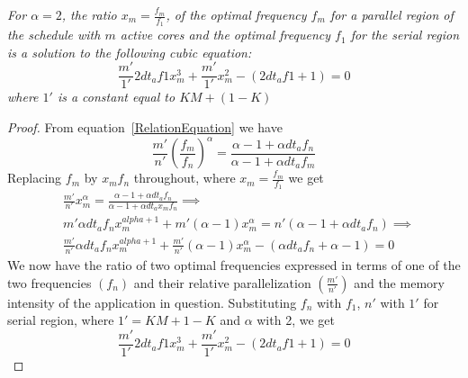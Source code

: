 \documentclass[11pt, letterpaper]{article}
\newenvironment{oldlem}[1]{\par\noindent{\bf Lemma #1:}
  \em \noindent}{\par}
\newcommand{\olem}[1]{\begin{oldlem}{\ref{#1}}}
\newcommand{\eolem}{\end{oldlem} \medskip}
\begin{document}
\olem{CubicEquation}
 For $\alpha=2$, the ratio $x_m= \frac{f_m}{f_1}$, of the optimal frequency $f_m$ for a parallel region of the schedule with $m$ active cores and the optimal frequency $f_1$ for the serial region is a solution to the following cubic equation:
 \begin{displaymath}
   \frac{m'}{1'}2dt_af1x_m^3 + \frac{m'}{1'}x_m^2 -(2dt_af1 + 1) = 0
 \end{displaymath}
 where $1'$ is a constant equal to $KM + (1-K)$
\eolem
\begin{proof}
 From equation~\ref{RelationEquation} we have
 \begin{displaymath}
  \frac{m'}{n'}(\frac{f_m}{f_n})^\alpha = \frac{\alpha -1 + \alpha dt_af_n}{\alpha -1 + \alpha dt_af_m}
 \end{displaymath}
 Replacing $f_m$ by $x_mf_n$ throughout, where $x_m = \frac{f_m}{f_1}$ we get
 \begin{displaymath}
 \begin{aligned}
  &\frac{m'}{n'}x_m^\alpha = \frac{\alpha -1 + \alpha dt_af_n}{\alpha -1 + \alpha dt_ax_mf_n} \implies\\
 & m'\alpha dt_af_nx_m^{alpha+1} + m'(\alpha-1)x_m^\alpha = n'(\alpha - 1 + \alpha dt_af_n) \implies \\
 &\frac{m'}{n'}\alpha dt_af_nx_m^{alpha+1} + \frac{m'}{n'}(\alpha-1)x_m^\alpha -(\alpha dt_af_n + \alpha -1) = 0
  \end{aligned}
 \end{displaymath}
 We now have the ratio of two optimal frequencies expressed in terms of one of the two frequencies $(f_n)$ and their relative parallelization $(\frac{m'}{n'})$ and the memory intensity of the application in question. 
 Substituting $f_n$ with $f_1$, $n'$ with $1'$ for serial region,  where $1'= KM + 1-K$  and $\alpha$ with 2, we get 
 \begin{equation}\label{RelativeCritical}
  \frac{m'}{1'}2dt_af1x_m^3 + \frac{m'}{1'}x_m^2 -(2dt_af1 + 1) = 0
  \end{equation}
\end{proof}
\end{document}
